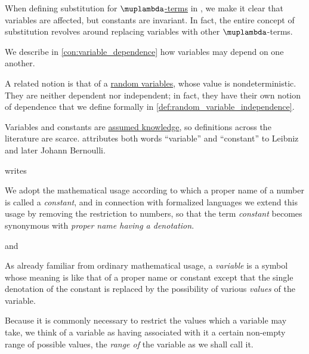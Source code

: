 \begin{comments}
  \item When defining substitution for \hyperref[def:lambda_term]{\( \muplambda \)-terms} in , we make it clear that variables are affected, but constants are invariant. In fact, the entire concept of substitution revolves around replacing variables with other \( \muplambda \)-terms.

  \item We describe in \cref{con:variable_dependence} how variables may depend on one another.

  \item A related notion is that of a \hyperref[def:random_variable]{random variables}, whose value is nondeterministic. They are neither dependent nor independent; in fact, they have their own notion of dependence that we define formally in \cref{def:random_variable_independence}.

  \item Variables and constants are \hyperref[con:assumed_knowledge]{assumed knowledge}, so definitions across the literature are scarce. \Textcite[340]{Kline1972MathematicalThoughtVol1} attributes both words \enquote{variable} and \enquote{constant} to Leibniz and later Johann Bernoulli.

  \Textcite[9]{Church1956LogicVol1} writes
  \begin{displayquote}
    We adopt the mathematical usage according to which a proper name of a number is called a \textit{constant}, and in connection with formalized languages we extend this usage by removing the restriction to numbers, so that the term \textit{constant} becomes synonymous with \textit{proper name having a denotation}.
  \end{displayquote}
  and
  \begin{displayquote}
    As already familiar from ordinary mathematical usage, a \textit{variable} is a symbol whose meaning is like that of a proper name or constant except that the single denotation of the constant is replaced by the possibility of various \textit{values} of the variable.

    Because it is commonly necessary to restrict the values which a variable may take, we think of a variable as having associated with it a certain non-empty range of possible values, the \textit{range of} the variable as we shall call it.
  \end{displayquote}
\end{comments}

